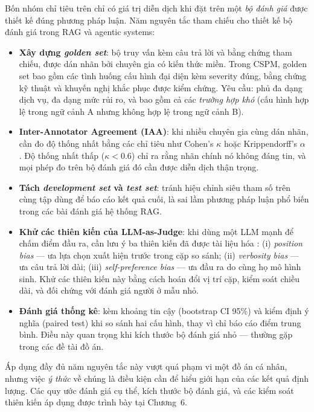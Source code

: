 Bốn nhóm chỉ tiêu trên chỉ có giá trị diễn dịch khi đặt trên một \textit{bộ đánh giá} được thiết kế đúng phương pháp luận. Năm nguyên tắc tham chiếu cho thiết kế bộ đánh giá trong RAG và agentic systems:

\begin{itemize}
  \item \textbf{Xây dựng \textit{golden set}}: bộ truy vấn kèm câu trả lời và bằng chứng tham chiếu, được dán nhãn bởi chuyên gia có kiến thức miền. Trong CSPM, golden set bao gồm các tình huống cấu hình đại diện kèm severity đúng, bằng chứng kỹ thuật và khuyến nghị khắc phục được kiểm chứng. Yêu cầu: phủ đa dạng dịch vụ, đa dạng mức rủi ro, và bao gồm cả các \textit{trường hợp khó} (cấu hình hợp lệ trong ngữ cảnh A nhưng không hợp lệ trong ngữ cảnh B).
  \item \textbf{Inter-Annotator Agreement (IAA)}: khi nhiều chuyên gia cùng dán nhãn, cần đo độ thống nhất bằng các chỉ tiêu như Cohen's $\kappa$ \cite{cohen_kappa_1960} hoặc Krippendorff's $\alpha$ \cite{krippendorff_alpha_2011}. Độ thống nhất thấp ($\kappa < 0.6$) chỉ ra rằng nhãn chính nó không đáng tin, và mọi phép đo trên bộ đánh giá đó cần được diễn dịch thận trọng.
  \item \textbf{Tách \textit{development set} và \textit{test set}}: tránh hiệu chỉnh siêu tham số trên cùng tập dùng để báo cáo kết quả cuối, là sai lầm phương pháp luận phổ biến trong các bài đánh giá hệ thống RAG.
  \item \textbf{Khử các thiên kiến của LLM-as-Judge}: khi dùng một LLM mạnh để chấm điểm đầu ra, cần lưu ý ba thiên kiến đã được tài liệu hóa \cite{liu_geval_2023,zheng2023llmjudge}: (i) \textit{position bias} --- ưa lựa chọn xuất hiện trước trong cặp so sánh; (ii) \textit{verbosity bias} --- ưa câu trả lời dài; (iii) \textit{self-preference bias} --- ưa đầu ra do cùng họ mô hình sinh. Khử các thiên kiến này bằng cách hoán đổi vị trí cặp, kiểm soát chiều dài, và đối chứng với đánh giá người ở mẫu nhỏ.
  \item \textbf{Đánh giá thống kê}: kèm khoảng tin cậy (bootstrap CI 95\%) và kiểm định ý nghĩa (paired test) khi so sánh hai cấu hình, thay vì chỉ báo cáo điểm trung bình. Điều này quan trọng khi kích thước bộ đánh giá nhỏ --- thường gặp trong các đề tài đồ án.
\end{itemize}

Áp dụng đầy đủ năm nguyên tắc này vượt quá phạm vi một đồ án cá nhân, nhưng việc \textit{ý thức} về chúng là điều kiện cần để hiểu giới hạn của các kết quả định lượng. Các quy ước đánh giá cụ thể, kích thước bộ đánh giá, và các kiểm soát thiên kiến áp dụng được trình bày tại Chương~6.

